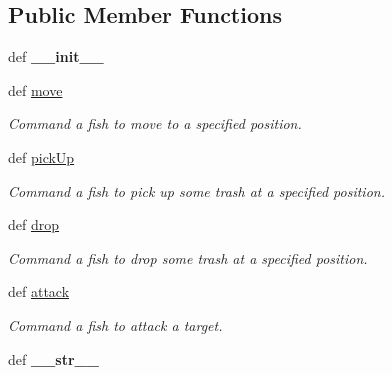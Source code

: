 \subsection*{\-Public \-Member \-Functions}
\begin{DoxyCompactItemize}
\item 
\hypertarget{classGameObject_1_1Fish_a9c41d3ee36e32d54b4c00947b17975c4}{def {\bfseries \-\_\-\-\_\-init\-\_\-\-\_\-}}\label{classGameObject_1_1Fish_a9c41d3ee36e32d54b4c00947b17975c4}

\item 
\hypertarget{classGameObject_1_1Fish_a1055fd35f2bb8e463ac94368f9d3f8dc}{def \hyperlink{classGameObject_1_1Fish_a1055fd35f2bb8e463ac94368f9d3f8dc}{move}}\label{classGameObject_1_1Fish_a1055fd35f2bb8e463ac94368f9d3f8dc}

\begin{DoxyCompactList}\small\item\em \-Command a fish to move to a specified position. \end{DoxyCompactList}\item 
\hypertarget{classGameObject_1_1Fish_aac0bc122704fa5857c47edb59bf18766}{def \hyperlink{classGameObject_1_1Fish_aac0bc122704fa5857c47edb59bf18766}{pick\-Up}}\label{classGameObject_1_1Fish_aac0bc122704fa5857c47edb59bf18766}

\begin{DoxyCompactList}\small\item\em \-Command a fish to pick up some trash at a specified position. \end{DoxyCompactList}\item 
\hypertarget{classGameObject_1_1Fish_a7260dd7fae3732142755c92d743952e8}{def \hyperlink{classGameObject_1_1Fish_a7260dd7fae3732142755c92d743952e8}{drop}}\label{classGameObject_1_1Fish_a7260dd7fae3732142755c92d743952e8}

\begin{DoxyCompactList}\small\item\em \-Command a fish to drop some trash at a specified position. \end{DoxyCompactList}\item 
\hypertarget{classGameObject_1_1Fish_a9065ca6a14a9b2ce70527a93b3efeaff}{def \hyperlink{classGameObject_1_1Fish_a9065ca6a14a9b2ce70527a93b3efeaff}{attack}}\label{classGameObject_1_1Fish_a9065ca6a14a9b2ce70527a93b3efeaff}

\begin{DoxyCompactList}\small\item\em \-Command a fish to attack a target. \end{DoxyCompactList}\item 
\hypertarget{classGameObject_1_1Fish_a36dde516c5e8f707c5980a6a4f791e56}{def {\bfseries \-\_\-\-\_\-str\-\_\-\-\_\-}}\label{classGameObject_1_1Fish_a36dde516c5e8f707c5980a6a4f791e56}

\end{DoxyCompactItemize}
